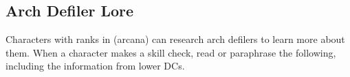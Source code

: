 


\subsection{Arch Defiler Lore}
Characters with ranks in  (arcana) can research arch defilers to learn more about them. When a character makes a skill check, read or paraphrase the following, including the information from lower DCs.

